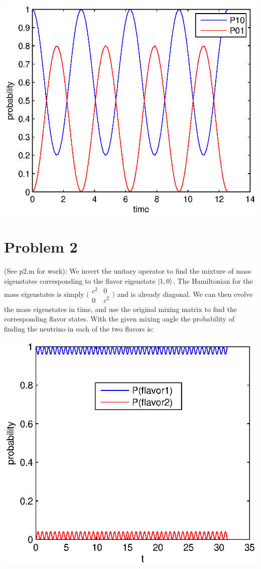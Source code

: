 \documentclass[a4paper,12pt]{article}
\numberwithin{equation}{section}
\begin{document}
\includegraphics{p1}
\\
\section{Problem 2}
(See p2.m for work): We invert the unitary operator to find the mixture of mass eigenstates corresponding to the flavor eigenstate $\ket{1,0}$.
The Hamiltonian for the mass eigenstates is simply $\bigl( \begin{smallmatrix}c^2 & 0 \\ 0 & c^2 \end{smallmatrix} \bigr )$ and is already diagonal.
We can then evolve the mass eigenstates in time, and use the original mixing matrix to find the corresponding flavor states. 
With the given mixing angle the probability of finding the neutrino in each of the two flavors is:

\includegraphics{p2}
\end{document}
